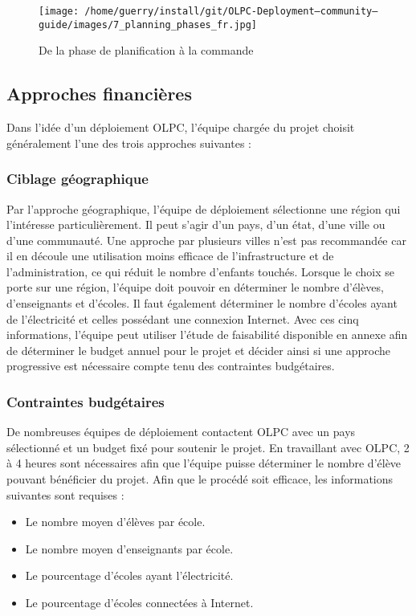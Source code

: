 \documentclass[12pt]{article}
\begin{document}
\begin{figure}[htb]
\centering
\texttt{[image: /home/guerry/install/git/OLPC-Deployment--community--guide/images/7\_planning\_phases\_fr.jpg]}
\caption{De la phase de planification à la commande}
\end{figure}
\subsection{Approches financières}
\label{sec-6-1}


Dans l'idée d'un déploiement OLPC, l'équipe chargée du projet choisit
généralement l'une des trois approches suivantes :
\subsubsection{Ciblage géographique}
\label{sec-6-1-1}


Par l'approche géographique, l'équipe de déploiement sélectionne une région
qui l'intéresse particulièrement. Il peut s'agir d'un pays, d'un état,
d'une ville ou d'une communauté. Une approche par plusieurs villes n'est
pas recommandée car il en découle une utilisation moins efficace de
l'infrastructure et de l'administration, ce qui réduit le nombre d'enfants
touchés. Lorsque le choix se porte sur une région, l'équipe doit pouvoir en
déterminer le nombre d'élèves, d'enseignants et d'écoles. Il faut également
déterminer le nombre d'écoles ayant de l'électricité et celles possédant
une connexion Internet. Avec ces cinq informations, l'équipe peut utiliser
l'étude de faisabilité disponible en annexe afin de déterminer le budget
annuel pour le projet et décider ainsi si une approche progressive est
nécessaire compte tenu des contraintes budgétaires.
\subsubsection{Contraintes budgétaires}
\label{sec-6-1-2}


De nombreuses équipes de déploiement contactent OLPC avec un pays
sélectionné et un budget fixé pour soutenir le projet. En travaillant avec
OLPC, 2 à 4 heures sont nécessaires afin que l'équipe puisse déterminer le
nombre d'élève pouvant bénéficier du projet. Afin que le procédé soit
efficace, les informations suivantes sont requises :

\begin{itemize}
\item Le nombre moyen d'élèves par école.
\item Le nombre moyen d'enseignants par école.
\item Le pourcentage d'écoles ayant l'électricité.
\item Le pourcentage d'écoles connectées à Internet.
\end{itemize}
\end{document}
